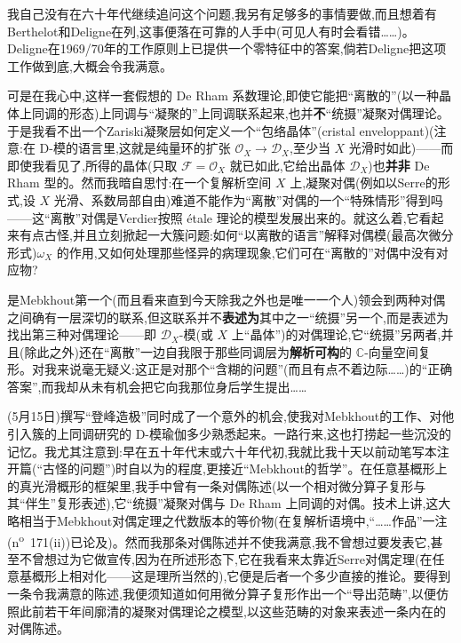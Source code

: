 我自己没有在六十年代继续追问这个问题,我另有足够多的事情要做,而且想着有Berthelot和Deligne在列,这事便落在可靠的人手中(可见人有时会看错……)。Deligne在1969/70年的工作原则上已提供一个零特征中的答案,倘若Deligne把这项工作做到底,大概会令我满意。

\noindent 可是在我心中,这样一套假想的 De Rham 系数理论,即使它能把“离散的”(以一种晶体上同调的形态)上同调与“凝聚的”上同调联系起来,也并\textbf{不}“统摄”凝聚对偶理论。于是我看不出一个Zariski凝聚层如何定义一个“包络晶体”(cristal enveloppant)(注意:在 D-模的语言里,这就是纯量环的扩张 $\mathcal{O}_X\to\mathcal{D}_X$,至少当 $X$ 光滑时如此)——而即使我看见了,所得的晶体(只取 $\mathcal{F}=\mathcal{O}_X$ 就已如此,它给出晶体 $\mathcal{D}_X$)也\textbf{并非} De Rham 型的。然而我暗自思忖:在一个复解析空间 $X$ 上,凝聚对偶(例如以Serre的形式,设 $X$ 光滑、系数局部自由)难道不能作为“离散”对偶的一个“特殊情形”得到吗——这“离散”对偶是Verdier按照 étale 理论的模型发展出来的。就这么着,它看起来有点古怪,并且立刻掀起一大簇问题:如何“以离散的语言”解释对偶模(最高次微分形式)$\omega_X$ 的作用,又如何处理那些怪异的病理现象,它们可在“离散的”对偶中没有对应物?

\dmark{}是Mebkhout第一个(而且看来直到今天除我之外也是唯一一个人)领会到两种对偶之间确有一层深切的联系,但这联系并不\textbf{表述为}其中之一“统摄”另一个,而是表述为找出第三种对偶理论——即 $\mathcal{D}_X$-模(或 $X$ 上“晶体”)的对偶理论,它“统摄”另两者,并且(除此之外)还在“离散”一边自我限于那些同调层为\textbf{解析可构}的 $\mathbb{C}$-向量空间复形。对我来说毫无疑义:这正是对那个“含糊的问题”(而且有点不着边际……)的“正确答案”,而我却从未有机会把它向我那位身后学生提出……

(5月15日)撰写“登峰造极”同时成了一个意外的机会,使我对Mebkhout的工作、对他引入簇的上同调研究的 D-模瑜伽多少熟悉起来。一路行来,这也打捞起一些沉没的记忆。我尤其注意到:早在五十年代末或六十年代初,我就比我十天以前动笔写本注开篇(“古怪的问题”)时自以为的程度,更接近“Mebkhout的哲学”。在任意基概形上的真光滑概形的框架里,我手中曾有一条对偶陈述(以一个相对微分算子复形与其“伴生”复形表述),它“统摄”凝聚对偶与 De Rham 上同调的对偶。技术上讲,这大略相当于Mebkhout对偶定理之代数版本的等价物(在复解析语境中,“……作品”一注(n\textsuperscript{o}~171(ii))已论及)。然而我那条对偶陈述并不使我满意,我不曾想过要发表它,甚至不曾想过为它做宣传,因为在所述形态下,它在我看来太靠近Serre对偶定理(在任意基概形上相对化——这是理所当然的),它便是后者一个多少直接的推论。要得到一条令我满意的陈述,我便须知道如何用微分算子复形作出一个“导出范畴”,以便仿照此前若干年间廓清的凝聚对偶理论之模型,以这些范畴的对象来表述一条内在的对偶陈述。

